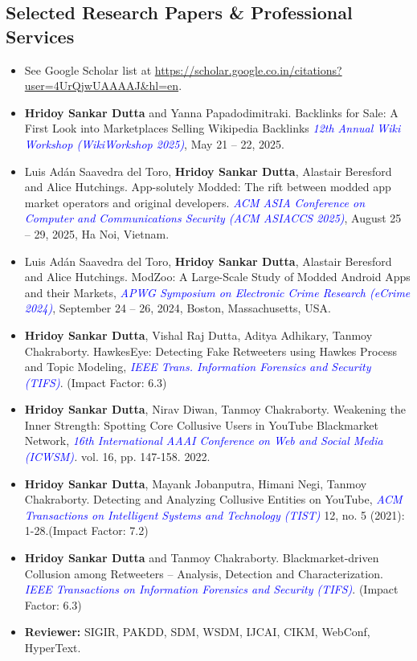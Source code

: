 \documentclass[margin, centered]{res}
\begin{document}
\begin{resume}
\section{Selected Research Papers \& Professional Services}
\begin{itemize}[leftmargin=*]
\item[] See Google Scholar list at \url{https://scholar.google.co.in/citations?user=4UrQjwUAAAAJ&hl=en}.
\item \textbf{Hridoy Sankar Dutta} and Yanna Papadodimitraki. Backlinks for Sale: A First Look into Marketplaces Selling Wikipedia Backlinks \textit{\textcolor{blue}{12th Annual Wiki Workshop (WikiWorkshop 2025)}}, May 21 – 22, 2025.
\item Luis Adán Saavedra del Toro,  \textbf{Hridoy Sankar Dutta}, Alastair Beresford and Alice Hutchings. App-solutely Modded: The rift between modded app market operators and original developers.   \textit{\textcolor{blue}{ACM ASIA Conference on Computer and Communications Security (ACM ASIACCS 2025)}}, August 25 – 29, 2025, Ha Noi, Vietnam.
\item Luis Adán Saavedra del Toro,  \textbf{Hridoy Sankar Dutta}, Alastair Beresford and Alice Hutchings.  ModZoo: A Large-Scale Study of Modded Android Apps and their Markets,  \textit{\textcolor{blue}{APWG Symposium on Electronic Crime Research (eCrime 2024)}}, September 24 – 26, 2024, Boston, Massachusetts, USA.
\item \textbf{Hridoy Sankar Dutta}, Vishal Raj Dutta, Aditya Adhikary, Tanmoy Chakraborty. HawkesEye: Detecting Fake Retweeters using Hawkes Process and Topic Modeling,  \textit{\textcolor{blue}{IEEE Trans. Information Forensics and Security (TIFS)}}. (Impact Factor: 6.3)
\item \textbf{Hridoy Sankar Dutta}, Nirav Diwan, Tanmoy Chakraborty. Weakening the Inner Strength: Spotting Core Collusive Users in YouTube Blackmarket Network,  \textit{\textcolor{blue}{16th International AAAI Conference on Web and Social Media (ICWSM)}.}  vol. 16, pp. 147-158. 2022.
\item \textbf{Hridoy Sankar Dutta}, Mayank Jobanputra, Himani Negi, Tanmoy Chakraborty. Detecting and Analyzing Collusive Entities on YouTube,   \textit{\textcolor{blue}{ACM Transactions on Intelligent Systems and Technology (TIST)}} 12, no. 5 (2021): 1-28.(Impact Factor: 7.2)
\item \textbf{Hridoy Sankar Dutta} and Tanmoy Chakraborty. Blackmarket-driven Collusion among Retweeters – Analysis, Detection and Characterization. \textit{\textcolor{blue}{IEEE Transactions on Information Forensics and Security (TIFS)}}. (Impact Factor: 6.3)
\item[] \textbf{Reviewer:} SIGIR, PAKDD, SDM, WSDM, IJCAI, CIKM, WebConf, HyperText.


\end{itemize}
\end{resume}
\end{document}
